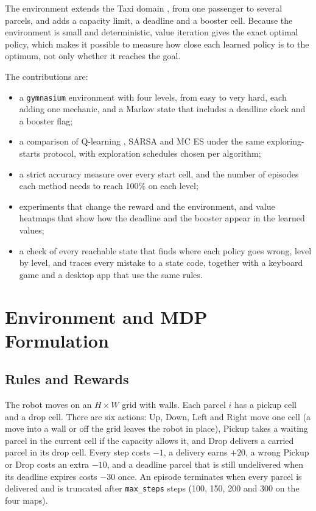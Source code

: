 \documentclass[conference]{IEEEtran}
\begin{document}
The environment extends the Taxi domain \cite{b4}, \cite{b5} from one passenger to several parcels, and adds a capacity limit, a deadline and a booster cell. Because the environment is small and deterministic, value iteration gives the exact optimal policy, which makes it possible to measure how close each learned policy is to the optimum, not only whether it reaches the goal.

The contributions are:
\begin{itemize}
\item a \texttt{gymnasium} environment \cite{b5} with four levels, from easy to very hard, each adding one mechanic, and a Markov state that includes a deadline clock and a booster flag;
\item a comparison of Q-learning \cite{b2}, SARSA \cite{b3} and MC ES \cite{b1} under the same exploring-starts protocol, with exploration schedules chosen per algorithm;
\item a strict accuracy measure over every start cell, and the number of episodes each method needs to reach 100\% on each level;
\item experiments that change the reward and the environment, and value heatmaps that show how the deadline and the booster appear in the learned values;
\item a check of every reachable state that finds where each policy goes wrong, level by level, and traces every mistake to a state code, together with a keyboard game and a desktop app that use the same rules.
\end{itemize}

\section{Environment and MDP Formulation}

\subsection{Rules and Rewards}
The robot moves on an $H\times W$ grid with walls. Each parcel $i$ has a pickup cell and a drop cell. There are six actions: Up, Down, Left and Right move one cell (a move into a wall or off the grid leaves the robot in place), Pickup takes a waiting parcel in the current cell if the capacity allows it, and Drop delivers a carried parcel in its drop cell. Every step costs $-1$, a delivery earns $+20$, a wrong Pickup or Drop costs an extra $-10$, and a deadline parcel that is still undelivered when its deadline expires costs $-30$ once. An episode terminates when every parcel is delivered and is truncated after \texttt{max\_steps} steps (100, 150, 200 and 300 on the four maps).
\end{document}
